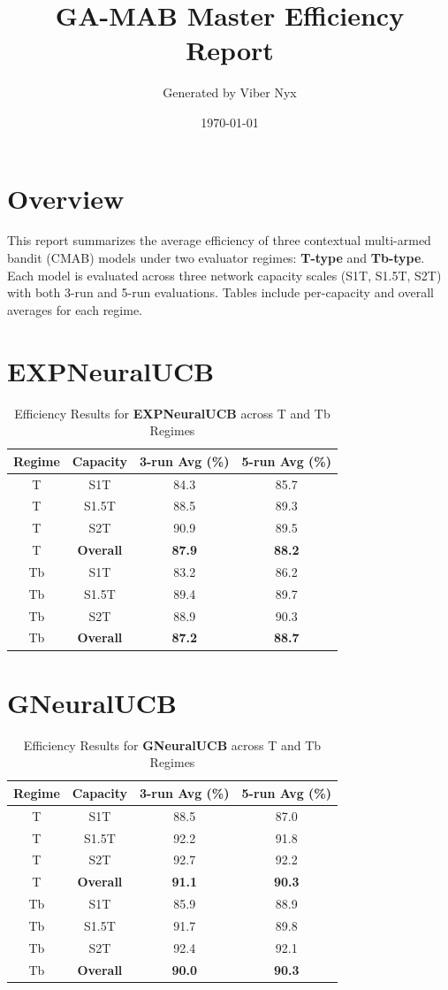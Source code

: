 \documentclass[11pt]{article}
\title{GA-MAB Master Efficiency Report}
\author{Generated by Viber Nyx}
\date{\today}
\begin{document}
\maketitle

\section*{Overview}
This report summarizes the average efficiency of three contextual multi-armed bandit (CMAB) models under two evaluator regimes: \textbf{T-type} and \textbf{Tb-type}. Each model is evaluated across three network capacity scales (S1T, S1.5T, S2T) with both 3-run and 5-run evaluations. Tables include per-capacity and overall averages for each regime.


\section*{EXPNeuralUCB}
\begin{table}[H]
\centering
\caption{Efficiency Results for \textbf{EXPNeuralUCB} across T and Tb Regimes}
\begin{tabular}{|c|c|c|c|}
\hline
Regime & Capacity & 3-run Avg (\%) & 5-run Avg (\%) \\ \hline
T & S1T & 84.3 & 85.7 \\
T & S1.5T & 88.5 & 89.3 \\
T & S2T & 90.9 & 89.5 \\
T & \textbf{Overall} & \textbf{87.9} & \textbf{88.2} \\ \hline
Tb & S1T & 83.2 & 86.2 \\
Tb & S1.5T & 89.4 & 89.7 \\
Tb & S2T & 88.9 & 90.3 \\
Tb & \textbf{Overall} & \textbf{87.2} & \textbf{88.7} \\ \hline
\end{tabular}
\end{table}

\section*{GNeuralUCB}
\begin{table}[H]
\centering
\caption{Efficiency Results for \textbf{GNeuralUCB} across T and Tb Regimes}
\begin{tabular}{|c|c|c|c|}
\hline
Regime & Capacity & 3-run Avg (\%) & 5-run Avg (\%) \\ \hline
T & S1T & 88.5 & 87.0 \\
T & S1.5T & 92.2 & 91.8 \\
T & S2T & 92.7 & 92.2 \\
T & \textbf{Overall} & \textbf{91.1} & \textbf{90.3} \\ \hline
Tb & S1T & 85.9 & 88.9 \\
Tb & S1.5T & 91.7 & 89.8 \\
Tb & S2T & 92.4 & 92.1 \\
Tb & \textbf{Overall} & \textbf{90.0} & \textbf{90.3} \\ \hline
\end{tabular}
\end{table}
\end{document}
